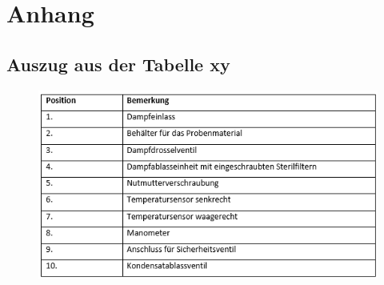 \newpage

\appendix
\chapter{Anhang}





\section{Auszug aus der Tabelle xy}
\begin{figure}[ht]
	\centering
  \includegraphics[width=1\textwidth]{anhang/tabelle1.png}
\end{figure}